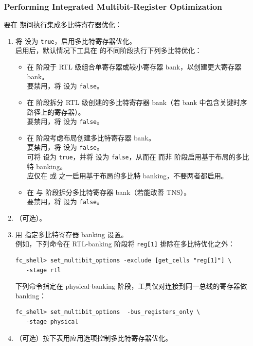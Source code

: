 \subsubsection*{Performing Integrated Multibit-Register Optimization}

要在  期间执行集成多比特寄存器优化：
\begin{enumerate}
  \item 将  设为 \texttt{true}，启用多比特寄存器优化。\\
    启用后，默认情况下工具在  的不同阶段执行下列多比特优化：
    \begin{itemize}
      \item 在  阶段于 RTL 级组合单寄存器或较小寄存器 bank，以创建更大寄存器 bank。\\
        要禁用，将  设为 \texttt{false}。
      \item 在  阶段拆分 RTL 级创建的多比特寄存器 bank（若 bank 中包含关键时序路径上的寄存器）。\\
        要禁用，将  设为 \texttt{false}。
      \item 在  阶段考虑布局创建多比特寄存器 bank。\\
        要禁用，将  设为 \texttt{false}。\\
        可将  设为 \texttt{true}，并将  设为 \texttt{false}，从而在  而非  阶段启用基于布局的多比特 banking。\\
        应仅在  或  之一启用基于布局的多比特 banking，不要两者都启用。
      \item 在  与  阶段拆分多比特寄存器 bank（若能改善 TNS）。\\
        要禁用，将  设为 \texttt{false}。
    \end{itemize}
  \item （可选）。
  \item 用  指定多比特寄存器 banking 设置。\\
    例如，下列命令在 RTL-banking 阶段将 \texttt{reg[1]} 排除在多比特优化之外：
\begin{lstlisting}
fc_shell> set_multibit_options -exclude [get_cells "reg[1]"] \
   -stage rtl
\end{lstlisting}
    下列命令指定在 physical-banking 阶段，工具仅对连接到同一总线的寄存器做 banking：
\begin{lstlisting}
fc_shell> set_multibit_options  -bus_registers_only \
   -stage physical
\end{lstlisting}
  \item （可选）按下表用应用选项控制多比特寄存器优化。


\end{enumerate}
